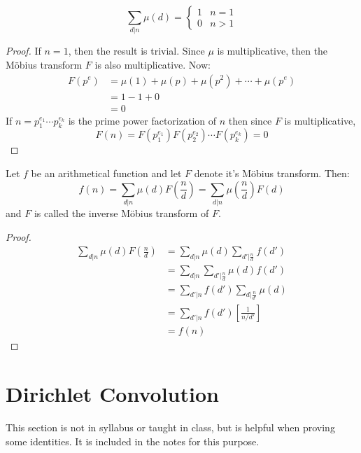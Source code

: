 \documentclass[12pt,letterpaper]{book}
\theoremstyle{definition}
\begin{document}
\begin{lemma}
  \[\sum_{d|n} \mu(d) = \begin{cases} 
    1 & n=1 \\
    0 & n > 1
  \end{cases}\] 
\end{lemma}
\begin{proof}
  If $n=1$, then the result is trivial. Since $\mu$ is multiplicative, then the M\"{o}bius transform $F$ is also multiplicative. Now:
  \begin{align*}
    F(p^e) &= \mu(1) + \mu(p) + \mu(p^2) + \cdots + \mu(p^e) \\
           &= 1-1+0\\
           &= 0
  \end{align*}
  If $n = p_1^{e_1} \cdots p_k^{e_k}$ is the prime power factorization of $n$ then since $F$ is multiplicative,
  \[F(n) = F(p_1^{e_1}) F(p_2^{e_2}) \cdots F(p_k^{e_k}) = 0\]
\end{proof}

\begin{theorem}
  Let $f$ be an arithmetical function and let $F$ denote it's M\"{o}bius transform. Then:
  \[f(n) = \sum_{d|n} \mu(d) F \left( \frac{n}{d} \right) = \sum_{d|n} \mu \left( \frac{n}{d} \right)F(d)\]
  and $F$ is called the inverse M\"{o}bius transform of $F$.
\end{theorem}
\begin{proof}
  \begin{align*}
    \sum_{d|n} \mu(d) F \left(\frac{n}{d}\right) &= \sum_{d|n} \mu(d) \sum_{d'|\frac{n}{d}} f(d') \\
                                                 &= \sum_{d|n} \sum_{d'|\frac{n}{d}} \mu(d) f(d') \\
                                                 &= \sum_{d'|n} f(d') \sum_{d|\frac{n}{d'}} \mu(d) \\
                                                 &= \sum_{d'|n} f(d') \left[ \frac{1}{n/d'} \right] \\
                                                 &= f(n)
  \end{align*}
\end{proof}

\section{Dirichlet Convolution}

This section is not in syllabus or taught in class, but is helpful when proving some identities. It is included in the notes for this purpose.
\end{document}

